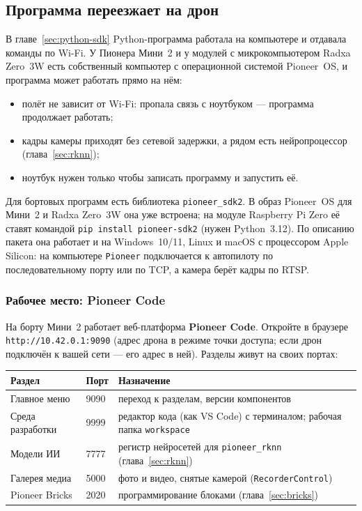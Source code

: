\subsection{Программа переезжает на дрон}

В главе~\ref{sec:python-sdk} Python-программа работала на компьютере и отдавала команды по Wi-Fi. У Пионера Мини~2 и у модулей с микрокомпьютером Radxa Zero~3W есть собственный компьютер с операционной системой Pioneer~OS, и программа может работать прямо на нём:
\begin{itemize}
    \item полёт не зависит от Wi-Fi: пропала связь с ноутбуком --- программа продолжает работать;
    \item кадры камеры приходят без сетевой задержки, а рядом есть нейропроцессор (глава~\ref{sec:rknn});
    \item ноутбук нужен только чтобы записать программу и запустить её.
\end{itemize}

Для бортовых программ есть библиотека \texttt{pioneer\_sdk2}. В образ Pioneer~OS для Мини~2 и Radxa Zero~3W она уже встроена; на модуле Raspberry Pi Zero её ставят командой \verb|pip install pioneer-sdk2| (нужен Python~3.12). По описанию пакета она работает и на Windows~10/11, Linux и macOS с процессором Apple Silicon: на компьютере \verb|Pioneer| подключается к автопилоту по последовательному порту или по TCP, а камера берёт кадры по RTSP.

\subsubsection*{Рабочее место: Pioneer Code}

На борту Мини~2 работает веб-платформа \textbf{Pioneer Code}. Откройте в браузере \texttt{http://10.42.0.1:9090} (адрес дрона в режиме точки доступа; если дрон подключён к вашей сети --- его адрес в ней). Разделы живут на своих портах:

\begin{center}
\small
\begin{tabularx}{\linewidth}{@{}l l X@{}}
\toprule
\textbf{Раздел} & \textbf{Порт} & \textbf{Назначение} \\
\midrule
Главное меню & 9090 & переход к разделам, версии компонентов \\
Среда разработки & 9999 & редактор кода (как VS Code) с терминалом; рабочая папка \texttt{workspace} \\
Модели ИИ & 7777 & регистр нейросетей для \texttt{pioneer\_rknn} (глава~\ref{sec:rknn}) \\
Галерея медиа & 5000 & фото и видео, снятые камерой (\verb|RecorderControl|) \\
Pioneer Bricks & 2020 & программирование блоками (глава~\ref{sec:bricks}) \\
\bottomrule
\end{tabularx}
\end{center}

